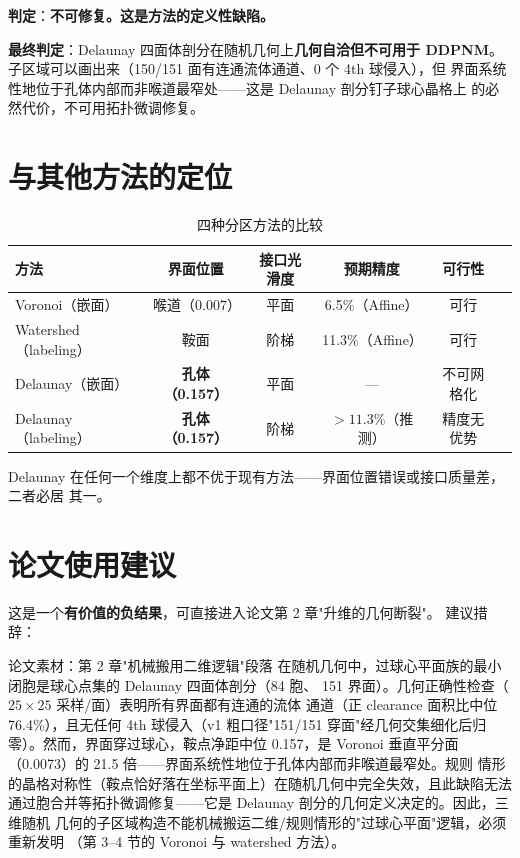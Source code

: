 \documentclass[UTF8,zihao=-4]{ctexart}
\begin{document}
\textbf{判定}：\textbf{不可修复。这是方法的定义性缺陷。}

\begin{verdictbox}
\textbf{最终判定}：Delaunay 四面体剖分在随机几何上\textbf{几何自洽但不可用于
DDPNM}。子区域可以画出来（150/151 面有连通流体通道、0 个 4th 球侵入），但
界面系统性地位于孔体内部而非喉道最窄处——这是 Delaunay 剖分钉子球心晶格上
的必然代价，不可用拓扑微调修复。
\end{verdictbox}

\section{与其他方法的定位}

\begin{table}[htbp]
\centering
\caption{四种分区方法的比较}
\label{tab:comparison}
\small
\begin{tabularx}{\textwidth}{lccccX}
\toprule
方法 & 界面位置 & 接口光滑度 & 预期精度 & 可行性\\
\midrule
Voronoi（嵌面） & 喉道（0.007）& 平面 & 6.5\%（Affine）& 可行\\
Watershed（labeling）& 鞍面 & 阶梯 & 11.3\%（Affine）& 可行\\
Delaunay（嵌面）& \textbf{孔体（0.157）} & 平面 & --- & 不可网格化\\
Delaunay（labeling）& \textbf{孔体（0.157）} & 阶梯 & $>11.3\%$（推测）& 精度无优势\\
\bottomrule
\end{tabularx}
\end{table}

Delaunay 在任何一个维度上都不优于现有方法——界面位置错误或接口质量差，二者必居
其一。

\section{论文使用建议}

这是一个\textbf{有价值的负结果}，可直接进入论文第 2 章"升维的几何断裂"。
建议措辞：

\bigskip

\begin{keybox}{论文素材：第 2 章"机械搬用二维逻辑"段落}
在随机几何中，过球心平面族的最小闭胞是球心点集的 Delaunay 四面体剖分（84 胞、
151 界面）。几何正确性检查（$25\times25$ 采样/面）表明所有界面都有连通的流体
通道（正 clearance 面积比中位 76.4\%），且无任何 4th 球侵入（v1 粗口径"151/151
穿面"经几何交集细化后归零）。然而，界面穿过球心，鞍点净距中位 0.157，是 Voronoi
垂直平分面（0.0073）的 21.5 倍——界面系统性地位于孔体内部而非喉道最窄处。规则
情形的晶格对称性（鞍点恰好落在坐标平面上）在随机几何中完全失效，且此缺陷无法
通过胞合并等拓扑微调修复——它是 Delaunay 剖分的几何定义决定的。因此，三维随机
几何的子区域构造不能机械搬运二维/规则情形的"过球心平面"逻辑，必须重新发明
（第 3--4 节的 Voronoi 与 watershed 方法）。
\end{keybox}
\end{document}
